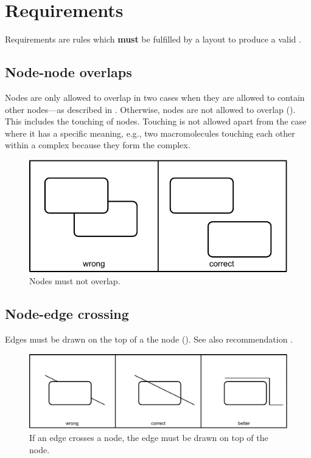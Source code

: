 \section{Requirements}

Requirements are rules which \textbf{must} be fulfilled by a layout to
produce a valid \PDm.

\subsection{Node-node overlaps}

Nodes are only allowed to overlap in two cases when they are allowed to contain other nodes---as described in . Otherwise, nodes are not allowed to overlap (). This includes the
touching of nodes. Touching is not allowed apart from the case where
it has a specific meaning, e.g., two macromolecules touching each
other within a complex because they form the complex.

\begin{figure}[htb]
  \centering
  \includegraphics[scale=0.8]{images/layout-node-node}
  \caption{Nodes must not overlap.}\label{fig:layout1}
\end{figure}

\subsection{Node-edge crossing}\label{crosEdNoRe}

Edges must be drawn on the top of a the node (). See also recommendation .

\begin{figure}[htb]
  \centering
  \includegraphics[scale=0.8]{images/layout-node-edge}
  \caption{If an edge crosses a node, the edge must be drawn on top
  of the node.}\label{fig:layout2}
\end{figure}

